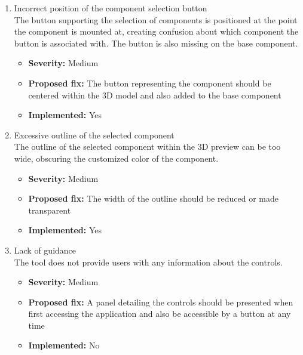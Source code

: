 \begin{enumerate}[label=\textbf{I\arabic*:}, leftmargin=*]
    \item Incorrect position of the component selection button
        \vspace{2pt}
        \\The button supporting the selection of components is positioned at the point the component is mounted at, creating confusion about which component the button is associated with. The button is also missing on the base component.
        \begin{itemize}[noitemsep, label=\trianglebullet]
            \item \textbf{Severity:} Medium
            \item \textbf{Proposed fix:} The button representing the component should be centered within the 3D model and also added to the base component
            \item \textbf{Implemented:} Yes
        \end{itemize}
        \vspace{4pt}

    \item Excessive outline of the selected component
        \vspace{2pt}
        \\The outline of the selected component within the 3D preview can be too wide, obscuring the customized color of the component.
        \begin{itemize}[noitemsep, label=\trianglebullet]
            \item \textbf{Severity:} Medium
            \item \textbf{Proposed fix:} The width of the outline should be reduced or made transparent
            \item \textbf{Implemented:} Yes
        \end{itemize}
        \vspace{4pt}

    \item Lack of guidance
        \vspace{2pt}
        \\The tool does not provide users with any information about the controls.
        \begin{itemize}[noitemsep, label=\trianglebullet]
            \item \textbf{Severity:} Medium
            \item \textbf{Proposed fix:} A panel detailing the controls should be presented when first accessing the application and also be accessible by a button at any time
            \item \textbf{Implemented:} No
        \end{itemize}
        \vspace{4pt}


\end{enumerate}
